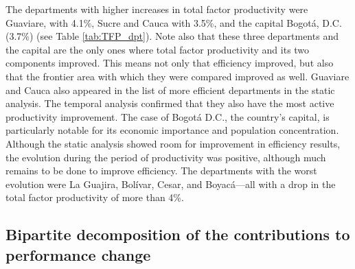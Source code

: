 \documentclass[11pt,a4paper,oneside]{article}
\begin{document}


The departments with higher increases in total factor productivity were Guaviare, with 4.1\%, Sucre and Cauca with 3.5\%, and the capital Bogot\'a, D.C. (3.7\%) (see Table \ref{tab:TFP_dpt}). Note also that these three departments and the capital are the only ones where total factor productivity and its two components improved. This means not only that efficiency improved, but also that the frontier area with which they were compared improved as well. Guaviare and Cauca also appeared in the list of more efficient departments in the static analysis. The temporal analysis confirmed that they also have the most active productivity improvement. The case of Bogot\'a D.C., the country's capital, is particularly notable for its economic importance and population concentration. Although the static analysis showed room for improvement in efficiency results, the evolution during the period of productivity was positive, although much remains to be done to improve efficiency. The departments with the worst evolution were La Guajira, Bol\'ivar, Cesar, and Boyac\'a---all with a drop in the total factor productivity of more than 4\%.



\subsection{Bipartite decomposition of the contributions to performance change}
\label{sec:bipartite_teo}
\end{document}
